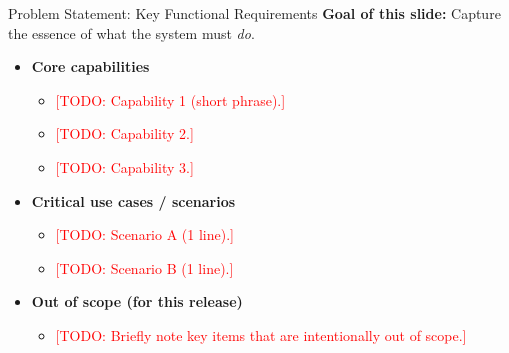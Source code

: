 \documentclass[aspectratio=169]{beamer}
\newcommand{\TODO}[1]{\textcolor{red}{[TODO: #1]}}
\begin{document}
\begin{frame}{Problem Statement: Key Functional Requirements}
  \textbf{Goal of this slide:} Capture the essence of what the system must \emph{do}.

  \begin{itemize}
    \item \textbf{Core capabilities}
      \begin{itemize}
        \item \TODO{Capability 1 (short phrase).}
        \item \TODO{Capability 2.}
        \item \TODO{Capability 3.}
      \end{itemize}
    \item \textbf{Critical use cases / scenarios}
      \begin{itemize}
        \item \TODO{Scenario A (1 line).}
        \item \TODO{Scenario B (1 line).}
       \end{itemize}
    \item \textbf{Out of scope (for this release)}
      \begin{itemize}
        \item \TODO{Briefly note key items that are intentionally out of scope.}
      \end{itemize}
  \end{itemize}
\end{frame}
\end{document}
